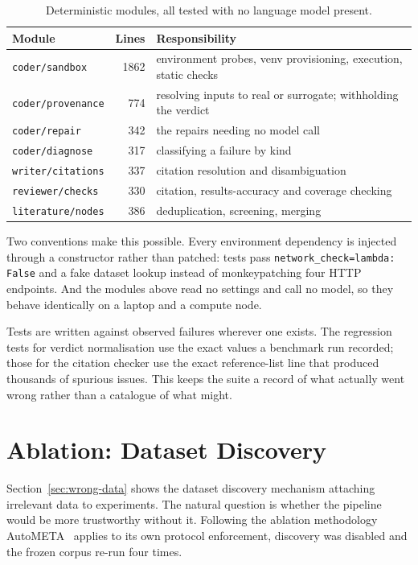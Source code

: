 \begin{table}[htbp]
\centering\small
\caption{Deterministic modules, all tested with no language model present.}
\label{tab:deterministic-modules}
\begin{tabularx}{\textwidth}{lrX}
\toprule
\textbf{Module} & \textbf{Lines} & \textbf{Responsibility} \\
\midrule
\texttt{coder/sandbox} & 1862 & environment probes, venv provisioning, execution, static checks \\
\texttt{coder/provenance} & 774 & resolving inputs to real or surrogate; withholding the verdict \\
\texttt{coder/repair} & 342 & the repairs needing no model call \\
\texttt{coder/diagnose} & 317 & classifying a failure by kind \\
\texttt{writer/citations} & 337 & citation resolution and disambiguation \\
\texttt{reviewer/checks} & 330 & citation, results-accuracy and coverage checking \\
\texttt{literature/nodes} & 386 & deduplication, screening, merging \\
\bottomrule
\end{tabularx}
\end{table}

Two conventions make this possible. Every environment dependency is injected
through a constructor rather than patched: tests pass
\texttt{network\_check=lambda: False} and a fake dataset lookup instead of
monkeypatching four HTTP endpoints. And the modules above read no settings and
call no model, so they behave identically on a laptop and a compute node.

Tests are written against observed failures wherever one exists. The regression
tests for verdict normalisation use the exact values a benchmark run recorded;
those for the citation checker use the exact reference-list line that produced
thousands of spurious issues. This keeps the suite a record of what actually went
wrong rather than a catalogue of what might.


\chapter{Ablation: Dataset Discovery}
\label{app:ablation}

Section~\ref{sec:wrong-data} shows the dataset discovery mechanism attaching
irrelevant data to experiments. The natural question is whether the pipeline
would be more trustworthy without it. Following the ablation methodology
AutoMETA~\cite{lee2026autometa} applies to its own protocol enforcement, discovery
was disabled and the frozen corpus re-run four times.

